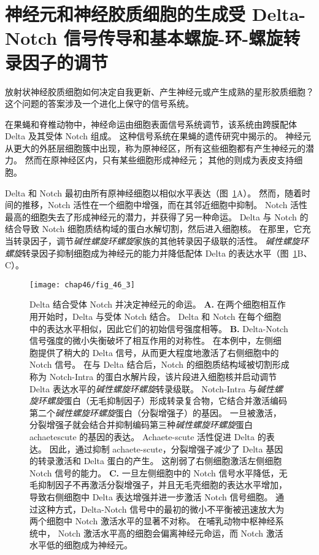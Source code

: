 \section{神经元和神经胶质细胞的生成受 Delta-Notch 信号传导和基本螺旋-环-螺旋转录因子的调节}

放射状神经胶质细胞如何决定自我更新、产生神经元或产生成熟的星形胶质细胞？
这个问题的答案涉及一个进化上保守的信号系统。


在果蝇和脊椎动物中，神经命运由细胞表面信号系统调节，该系统由跨膜配体 Delta 及其受体 Notch 组成。
这种信号系统在果蝇的遗传研究中揭示的。
神经元从更大的外胚层细胞簇中出现，称为原神经区，所有这些细胞都有产生神经元的潜力。
然而在原神经区内，只有某些细胞形成神经元；
其他的则成为表皮支持细胞。 


Delta 和 Notch 最初由所有原神经细胞以相似水平表达（图~\ref{fig:46_3}A）。
然而，随着时间的推移，Notch 活性在一个细胞中增强，而在其邻近细胞中抑制。
Notch 活性最高的细胞失去了形成神经元的潜力，并获得了另一种命运。
Delta 与 Notch 的结合导致 Notch 细胞质结构域的蛋白水解切割，然后进入细胞核。
在那里，它充当转录因子，调节\textit{碱性螺旋环螺旋}家族的其他转录因子级联的活性。
\textit{碱性螺旋环螺旋}转录因子抑制细胞成为神经元的能力并降低配体 Delta 的表达水平（图~\ref{fig:46_3}B、C）。


\begin{figure}[htbp]
	\centering
	\texttt{[image: chap46/fig\_46\_3]}
	\caption{Delta 结合受体 Notch 并决定神经元的命运。
		\textbf{A.} 在两个细胞相互作用开始时，Delta 与受体 Notch 结合。
		Delta 和 Notch 在每个细胞中的表达水平相似，因此它们的初始信号强度相等。
		\textbf{B.} Delta-Notch 信号强度的微小失衡破坏了相互作用的对称性。
		在本例中，左侧细胞提供了稍大的 Delta 信号，从而更大程度地激活了右侧细胞中的 Notch 信号。
		在与 Delta 结合后，Notch 的细胞质结构域被切割形成称为 Notch-Intra 的蛋白水解片段，该片段进入细胞核并启动调节 Delta 表达水平的\textit{碱性螺旋环螺旋}转录级联。
		Notch-Intra 与\textit{碱性螺旋环螺旋}蛋白（无毛抑制因子）形成转录复合物，它结合并激活编码第二个\textit{碱性螺旋环螺旋}蛋白（分裂增强子）的基因。
		一旦被激活，分裂增强子就会结合并抑制编码第三种\textit{碱性螺旋环螺旋}蛋白 achaetescute 的基因的表达。
		Achaete-scute 活性促进 Delta 的表达。
		因此，通过抑制 achaete-scute，分裂增强子减少了 Delta 基因的转录激活和 Delta 蛋白的产生。
		这削弱了右侧细胞激活左侧细胞 Notch 信号的能力。
		\textbf{C.} 一旦左侧细胞中的 Notch 信号水平降低，无毛抑制因子不再激活分裂增强子，并且无毛壳细胞的表达水平增加，导致右侧细胞中 Delta 表达增强并进一步激活 Notch 信号细胞。
		通过这种方式，Delta-Notch 信号中的最初的微小不平衡被迅速放大为两个细胞中 Notch 激活水平的显著不对称。
		在哺乳动物中枢神经系统中， Notch 激活水平高的细胞会偏离神经元命运，而 Notch 激活水平低的细胞成为神经元。}
	\label{fig:46_3}
\end{figure}


